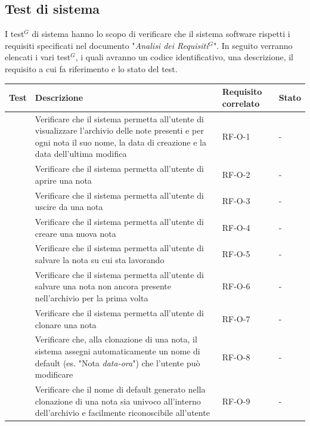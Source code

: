 \documentclass[a4paper,10pt]{article}
\begin{document}
\subsection{Test di sistema}
I test$^G$ di sistema hanno lo scopo di verificare che il sistema software rispetti i requisiti specificati nel documento "\textit{Analisi dei Requisiti$^G$}". In seguito verranno elencati i vari test$^G$, i quali avranno un codice identificativo, una descrizione, il requisito a cui fa riferimento e lo stato del test. \\


\newcommand{\testS}{%
    \stepcounter{TS@}%
    \noindent{TS-\arabic{TS@}}\quad\par
}

\begin{longtable}{|l|p{8cm}|p{2cm}|p{1.5cm}|}
    \hline
    \textbf{Test} & \textbf{Descrizione} & \textbf{Requisito correlato} & \textbf{Stato} \\ \hline
    \endfirsthead
    \hline
    \testS & Verificare che il sistema permetta all'utente di visualizzare l'archivio delle note presenti e per ogni nota il suo nome, la data di creazione e la data dell'ultima modifica & RF-O-1 & - \\ \hline
    \testS & Verificare che il sistema permetta all'utente di aprire una nota & RF-O-2 & - \\ \hline
    \testS & Verificare che il sistema permetta all'utente di uscire da una nota & RF-O-3 & - \\ \hline
    \testS & Verificare che il sistema permetta all'utente di creare una nuova nota & RF-O-4 & - \\ \hline
    \testS & Verificare che il sistema permetta all'utente di salvare la nota su cui sta lavorando & RF-O-5 & - \\ \hline
    \testS & Verificare che il sistema permetta all'utente di salvare una nota non ancora presente nell'archivio per la prima volta & RF-O-6 & - \\ \hline
    \testS & Verificare che il sistema permetta all'utente di clonare una nota & RF-O-7 & - \\ \hline
    \testS & Verificare che, alla clonazione di una nota, il sistema assegni automaticamente un nome di default (es. "Nota \textit{data-ora}") che l’utente può modificare & RF-O-8 & - \\ \hline
    \testS & Verificare che il nome di default generato nella clonazione di una nota sia univoco all'interno dell'archivio e facilmente riconoscibile all'utente & RF-O-9 & - \\ \hline

\end{longtable}
\end{document}
